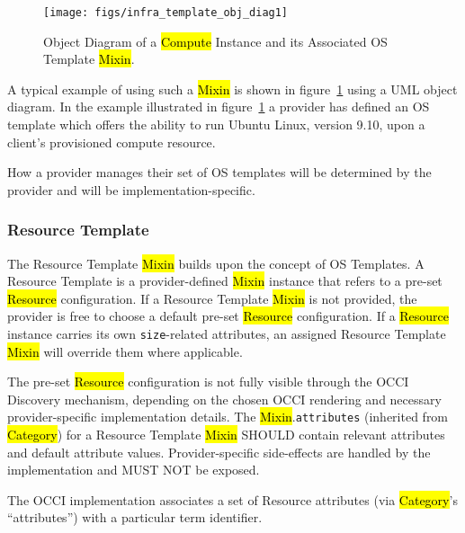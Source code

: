 \documentclass[10pt,a4paper]{article}
\begin{document}
\begin{figure}[!h]
	\centering
	\texttt{[image: figs/infra\_template\_obj\_diag1]}
	\caption{Object Diagram of a \hl{Compute} Instance and its Associated OS Template \hl{Mixin}.}
	\label{fig:infra_template_obj_diag1}
\end{figure}


A typical example of using such a \hl{Mixin} is shown in
figure~\ref{fig:infra_template_obj_diag1} using a UML object diagram.
In the example illustrated in
figure~\ref{fig:infra_template_obj_diag1} a provider has defined an OS
template which offers the ability to run Ubuntu Linux, version 9.10,
upon a client's provisioned compute resource.

How a provider manages their set of OS templates will be determined by
the provider and will be implementation-specific.

\subsubsection{Resource Template}
The Resource Template \hl{Mixin} builds upon the concept of OS
Templates. A Resource Template is a provider-defined \hl{Mixin}
instance that refers to a pre-set \hl{Resource} configuration.
If a Resource Template \hl{Mixin} is not provided, the provider
is free to choose a default pre-set \hl{Resource} configuration.
If a \hl{Resource} instance carries its own \texttt{size}-related
attributes, an assigned Resource Template \hl{Mixin} will override them
where applicable.

The pre-set \hl{Resource} configuration is not fully visible through the OCCI
Discovery mechanism, depending on the chosen OCCI rendering and necessary
provider-specific implementation details. The \hl{Mixin}.{\tt attributes} (inherited from
\hl{Category}) for a Resource Template \hl{Mixin} SHOULD contain relevant attributes
and default attribute values. Provider-specific side-effects are handled by the
implementation and MUST NOT be exposed.

The OCCI implementation associates a set of Resource attributes (via
\hl{Category}'s ``attributes'') with a particular term identifier.
\end{document}
